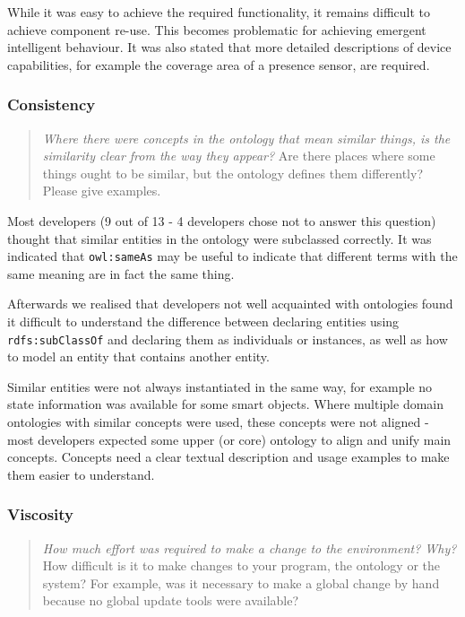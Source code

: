 While it was easy to achieve the required functionality, it remains difficult to achieve component re-use. This becomes problematic for achieving emergent intelligent behaviour. 
It was also stated that more detailed descriptions of device capabilities, for example the coverage area of a presence sensor, are required.


\subsubsection{Consistency}

\begin{quote}
	\emph{Where there were concepts in the ontology that mean similar things, is the similarity clear from the way they appear?}
	Are there places where some things ought to be similar, but the ontology defines them differently? Please give examples.
\end{quote}

Most developers (9 out of 13 - 4 developers chose not to answer this question) thought that similar entities in the ontology were subclassed correctly. It was indicated that \texttt{owl:sameAs} may be useful to indicate that different terms with the same meaning are in fact the same thing.

Afterwards we realised that developers not well acquainted with ontologies found it difficult to understand the difference between declaring entities using \texttt{rdfs:sub\-Class\-Of} and declaring them as individuals or instances, as well as how to model an entity that contains another entity.

Similar entities were not always instantiated in the same way, for example no state information was available for some smart objects.
Where multiple domain ontologies with similar concepts were used, these concepts were not aligned - most developers expected some upper (or core) ontology to align and unify main concepts.
Concepts need a clear textual description and usage examples to make them easier to understand.

\subsubsection{Viscosity}

\begin{quote}
	\emph{How much effort was required to make a change to the environment? Why?}
	How difficult is it to make changes to your program, the ontology or the system? For example, was it necessary to make a global change by hand because no global update tools were available?
\end{quote}

